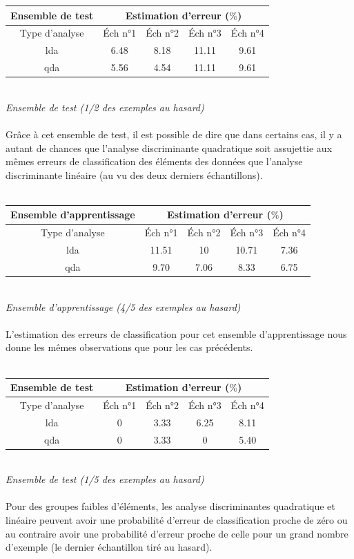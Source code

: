 \documentclass[a4paper, 10pt]{article}
\begin{document}
\begin{tabular}{|c|c|c|c|c|}
\hline
\textbf{Ensemble de test} & \multicolumn{4}{|c|}{Estimation d'erreur ($\%$)} \\
\hline
Type d'analyse & Éch n°1 & Éch n°2 & Éch n°3 & Éch n°4 \\
\hline
lda & 6.48 & 8.18 & 11.11 & 9.61 \\
\hline
qda & 5.56 & 4.54 & 11.11 & 9.61 \\
\hline
\end{tabular}\\
\textit{Ensemble de test (1/2 des exemples au hasard)}\\ \\
Grâce à cet ensemble de test, il est possible de dire que dans certains cas, il y a autant de chances que l'analyse discriminante quadratique
soit assujettie aux mêmes erreurs de classification des éléments des données que l'analyse discriminante linéaire
(au vu des deux derniers échantillons).\\ \\
\begin{tabular}{|c|c|c|c|c|}
\hline
\textbf{Ensemble d'apprentissage} & \multicolumn{4}{|c|}{Estimation d'erreur ($\%$)} \\
\hline
Type d'analyse & Éch n°1 & Éch n°2 & Éch n°3 & Éch n°4 \\
\hline
lda & 11.51 & 10 & 10.71 & 7.36 \\
\hline
qda & 9.70 & 7.06 & 8.33 & 6.75 \\
\hline
\end{tabular}\\
\textit{Ensemble d'apprentissage (4/5 des exemples au hasard)}\\ \\
L'estimation des erreurs de classification pour cet ensemble d'apprentissage nous donne les mêmes observations que pour les cas précédents.\\ \\
\begin{tabular}{|c|c|c|c|c|}
\hline
\textbf{Ensemble de test} & \multicolumn{4}{|c|}{Estimation d'erreur ($\%$)} \\
\hline
Type d'analyse & Éch n°1 & Éch n°2 & Éch n°3 & Éch n°4 \\
\hline
lda & 0 & 3.33 & 6.25 & 8.11 \\
\hline
qda & 0 & 3.33 & 0 & 5.40 \\
\hline
\end{tabular}\\
\textit{Ensemble de test (1/5 des exemples au hasard)}\\ \\
Pour des groupes faibles d'éléments, les analyse discriminantes quadratique et linéaire peuvent avoir une probabilité d'erreur de classification
proche de zéro ou au contraire avoir une probabilité d'erreur proche de celle pour un grand nombre d'exemple
(le dernier échantillon tiré au hasard).\\ \\
\end{document}
